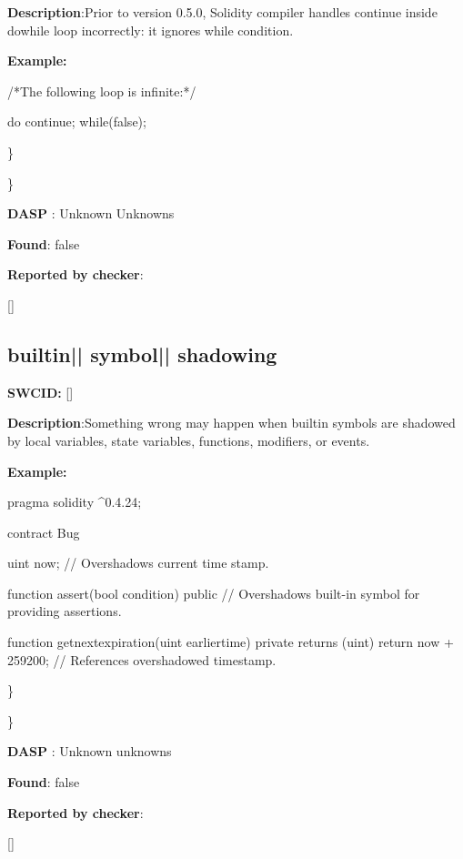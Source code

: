 \documentclass{article}
\begin{document}
\textbf{Description}:Prior to version 0.5.0, Solidity compiler handles continue inside do{\textendash}while loop incorrectly: it ignores while condition.


\textbf{Example:} 
\begin{ffcode} 

/*The following loop is infinite:*/ 

do {
    continue;
} while(false);

\end{ffcode} 
\} 

\} 

\textbf{DASP} : Unknown Unknowns

\textbf{Found}: false

\textbf{Reported by checker}: 
\begin{ffcode} 

[]
\end{ffcode} 
\subsection{builtin{|\textunderscore| }symbol{|\textunderscore| }shadowing} 
\textbf{SWC{\textunderscore }ID:} []

\textbf{Description}:Something wrong may happen when built{\textendash}in symbols are shadowed by local variables, state variables, functions, modifiers, or events.


\textbf{Example:} 
\begin{ffcode} 

pragma solidity ^0.4.24;

contract Bug {
    uint now; // Overshadows current time stamp.

    function assert(bool condition) public {
        // Overshadows built-in symbol for providing assertions.
    }

    function get\textunderscore next\textunderscore expiration(uint earlier\textunderscore time) private returns (uint) {
        return now + 259200; // References overshadowed timestamp.
    }
}

\end{ffcode} 
\} 

\} 

\textbf{DASP} : Unknown unknowns

\textbf{Found}: false

\textbf{Reported by checker}: 
\begin{ffcode} 

[]
\end{ffcode} 
\end{document}
